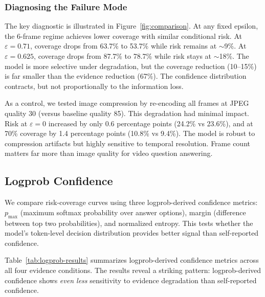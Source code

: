 \documentclass{article}
\begin{document}
\subsubsection{Diagnosing the Failure Mode}

The key diagnostic is illustrated in Figure~\ref{fig:comparison}. At any fixed epsilon, the 6-frame regime achieves lower coverage with similar conditional risk. At $\varepsilon=0.71$, coverage drops from 63.7\% to 53.7\% while risk remains at $\sim$9\%. At $\varepsilon=0.625$, coverage drops from 87.7\% to 78.7\% while risk stays at $\sim$18\%. The model is more selective under degradation, but the coverage reduction (10--15\%) is far smaller than the evidence reduction (67\%). The confidence distribution contracts, but not proportionally to the information loss.

As a control, we tested image compression by re-encoding all frames at JPEG quality 30 (versus baseline quality 85). This degradation had minimal impact. Risk at $\varepsilon=0$ increased by only 0.6 percentage points (24.2\% vs 23.6\%), and at 70\% coverage by 1.4 percentage points (10.8\% vs 9.4\%). The model is robust to compression artifacts but highly sensitive to temporal resolution. Frame count matters far more than image quality for video question answering.

\subsection{Logprob Confidence}

We compare risk-coverage curves using three logprob-derived confidence metrics: $p_{\max}$ (maximum softmax probability over answer options), margin (difference between top two probabilities), and normalized entropy. This tests whether the model's token-level decision distribution provides better signal than self-reported confidence.

Table~\ref{tab:logprob-results} summarizes logprob-derived confidence metrics across all four evidence conditions. The results reveal a striking pattern: logprob-derived confidence shows \emph{even less} sensitivity to evidence degradation than self-reported confidence.
\end{document}
